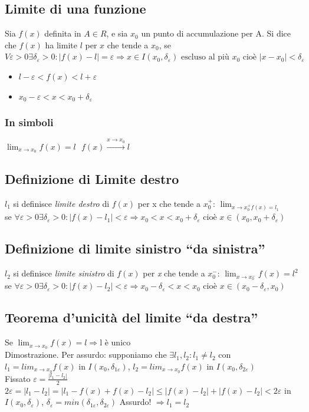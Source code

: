 \subsection{Limite di una funzione}
Sia $f(x)$ definita in $A\in R$, e sia $x_0$ un punto di accumulazione per A.
Si dice che $f(x)$ ha limite $l$ per $x$ che tende a $x_0$, se $V\varepsilon
>0 \exists \delta_\varepsilon > 0: |f(x)-l|=\varepsilon\Rightarrow x\in
I(x_0,\delta_\varepsilon) \text{ escluso al più } x_0 \text{ cioè }
|x-x_0|<\delta_\varepsilon$
\begin{itemize}
	\item $l-\varepsilon < f(x) < l+\varepsilon$
	\item $x_0-\varepsilon < x<x_0+\delta_\varepsilon$
\end{itemize}
\subsubsection{In simboli}
$\lim_{x\to x_0} f(x)=l \text{   } f(x)\xrightarrow{x\to x_0} l$ 
\subsection{Definizione di Limite destro}
$l_1$ si definisce \textit{limite 
destro} di $f(x)$ per x che tende a $x_0^+$: $\lim_{x\to x_0^+ f(x)=l_1}$\\
se $\forall \varepsilon > 0 \exists \delta_\varepsilon>0 :
|f(x)-l_1|<\varepsilon\Rightarrow x_0<x<x_0+\delta_\varepsilon \text{ cioè }
x\in(x_0,x_0+\delta_\varepsilon)$
\subsection{Definizione di limite sinistro ``da sinistra''}
$l_2$ si definisce \textit{limite sinistro} di $f(x)$ per \textit{x} che tende
a $x^-_0$: $\lim_{x\to x_0^-}f(x)=l^2$ se $\forall \varepsilon>0 \exists
\delta_\varepsilon>0: |f(x)-l_2|<\varepsilon\Rightarrow
x_0-\delta_\varepsilon<x<x_0$ cioè $x\in(x_0-\delta_\varepsilon,x_0)$
\subsection{Teorema d'unicità del limite ``da destra''}
Se $\lim_{x\to x_0} f(x)=l\Rightarrow \text{l è unico}$\\
Dimostrazione. Per assurdo: supponiamo che $\exists l_1,l_2: l_1 \neq l_2$
con $l_1=lim_{x\to x_0}f(x)$ in $I(x_0,\delta_{1\varepsilon})$, $l_2=lim_{x\to
x_0}f(x)$ in $I(x_0,\delta_{2\varepsilon})$\\
Fissato $\varepsilon=\frac{|l_1-l_2|}{2}$\\
$2\varepsilon=|l_1-l_2|=|l_1-f(x)+f(x)-l_2|\leq|f(x)-l_2|+|f(x)-l_2|<2\varepsilon$
in $I(x_0,\delta_{\varepsilon})$,
$\delta_{\varepsilon}=min(\delta_{1\varepsilon},\delta_{2\varepsilon})$
Assurdo! $\Rightarrow l_1=l_2$
